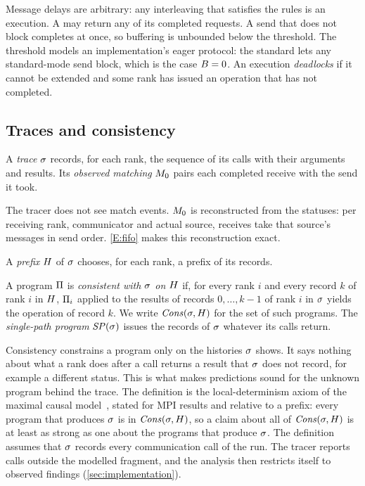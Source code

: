 Message delays are arbitrary: any interleaving that satisfies the rules is an execution.
A  may return any of its completed requests. A send that does not block
completes at once, so buffering is unbounded below the threshold. The threshold models an
implementation's eager protocol: the standard lets any standard-mode send block, which is
the case $B=0$. An execution
\emph{deadlocks} if it cannot be extended and some rank has issued an operation that has
not completed.

\subsection{Traces and consistency}

\begin{definition}[Trace]
A \emph{trace} $\sigma$ records, for each rank, the sequence of its calls with their
arguments and results. Its \emph{observed matching} $M_0$ pairs each completed receive
with the send it took.
\end{definition}

The tracer does not see match events. $M_0$ is reconstructed from the statuses:
per receiving rank, communicator and actual source, receives take that source's messages
in send order. \ref{E:fifo} makes this reconstruction exact.

A \emph{prefix} $H$ of $\sigma$ chooses, for each rank, a prefix of its records.

\begin{definition}[Consistency]
A program $\Pi$ is \emph{consistent with $\sigma$ on $H$} if, for every rank $i$
and every record $k$ of rank $i$ in $H$, $\Pi_i$ applied to the results of
records $0,\dots,k-1$ of rank $i$ in $\sigma$ yields the operation of record $k$. We write
$\mathit{Cons}(\sigma,H)$ for the set of such programs. The \emph{single-path program}
$\mathit{SP}(\sigma)$ issues the records of $\sigma$ whatever its calls return.
\end{definition}

Consistency constrains a program only on the histories $\sigma$ shows. It says nothing
about what a rank does after a call returns a result that $\sigma$ does not record, for
example a different status. This is what makes predictions sound for the unknown program
behind the trace. The definition is the local-determinism axiom of the maximal causal
model~\citep{serbanuta12mcm}, stated for MPI results and relative to a prefix: every program
that produces $\sigma$ is in $\mathit{Cons}(\sigma,H)$, so a claim about all of
$\mathit{Cons}(\sigma,H)$ is at least as strong as one about the programs that produce $\sigma$.
The definition assumes that $\sigma$ records every communication call of the run. The tracer reports calls outside the modelled fragment, and the analysis then
restricts itself to observed findings (\cref{sec:implementation}).

